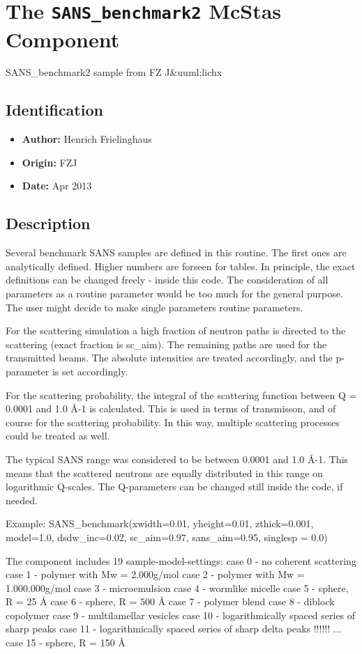 \section{The \texttt{SANS\_benchmark2} McStas Component}
SANS\_benchmark2 sample from FZ J\&uuml;lichx

\subsection*{Identification}
\begin{itemize}
  \item \textbf{Author:} Henrich Frielinghaus
  \item \textbf{Origin:} FZJ
  \item \textbf{Date:} Apr 2013
\end{itemize}

\subsection*{Description}
Several benchmark SANS samples are defined in this routine. The first ones are analytically defined. Higher numbers are forseen for tables. In principle, the exact definitions can be changed freely - inside this code. The consideration of all parameters as a routine parameter would be too much for the general purpose. The user might decide to make single parameters routine parameters.

For the scattering simulation a high fraction of neutron paths is directed to the scattering (exact fraction is sc\_aim). The remaining paths are used for the transmitted beams. The absolute intensities are treated accordingly, and the p-parameter is set accordingly.

For the scattering probability, the integral of the scattering function between Q = 0.0001 and 1.0 \AA{}-1 is calculated. This is used in terms of transmisson, and of course for the scattering probability. In this way, multiple scattering processes could be treated as well.

The typical SANS range was considered to be between 0.0001 and 1.0 \AA{}-1. This means that the scattered neutrons are equally distributed in this range on logarithmic Q-scales. The Q-parameters can be changed still inside the code, if needed.

Example: SANS\_benchmark(xwidth=0.01, yheight=0.01, zthick=0.001, model=1.0, dsdw\_inc=0.02, sc\_aim=0.97, sans\_aim=0.95, singlesp = 0.0)

The component includes 19 sample-model-settings: case 0 - no coherent scattering case 1 - polymer with Mw = 2.000g/mol case 2 - polymer with Mw = 1.000.000g/mol case 3 - microemulsion case 4 - wormlike micelle case 5 - sphere, R = 25 \AA{} case 6 - sphere, R = 500 \AA{} case 7 - polymer blend case 8 - diblock copolymer case 9 - multilamellar vesicles case 10 - logarithmically spaced series of sharp peaks case 11 - logarithmically spaced series of sharp delta peaks !!!!!! ... case 15 - sphere, R = 150 \AA{}

